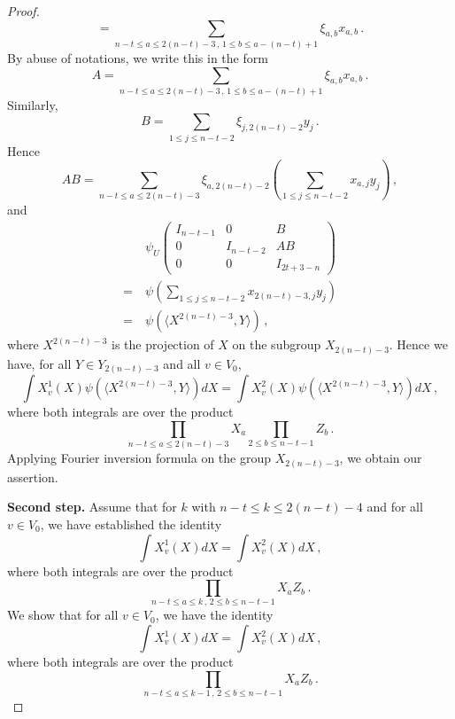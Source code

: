 \documentclass[12pt]{amsart}
\begin{document}
\begin{proof}
\[= \sum _{n-t\leq a \leq 2(n-t)-3\,,\, 1 \leq b\leq a -(n-t) +1} \xi_{a,b} x _{a,b} \,.\]
By abuse of notations, we write this in the form
\[A = \sum _{n-t\leq a \leq 2(n-t)-3\,,\, 1 \leq b\leq a -(n-t) +1} \xi_{a,b} x _{a,b} \,.\]
Similarly,  
\[ B = \sum _{1\leq j \leq n-t-2} \xi_{j, {2(n-t)-2}}y_j \,.\]
Hence
\[ AB = \sum _{n-t\leq a \leq 2(n-t)-3} \xi_{a, 2(n-t)-2} \left( \sum_{1\leq j\leq n-t-2} x_{a,j} y_j\right) \,,\]
and
\begin{align*}
& \psi_U \left(\begin{array}{ccc} I_{n-t-1} & 0 & B \\ 0 & I_{ n-t-2}& AB \\ 0 &0 &I_{ 2t + 3 -n} \end{array}\right)  \\
= \ & \psi\left(\sum_{1\leq j\leq n-t-2} x_{2(n-t)-3,j} y_j \right)\\
= \ & \psi(\langle X^{2(n-t)-3}, Y\rangle)\,, 
\end{align*}
where $ X^{2(n-t)-3}$ is the projection of $X$ on the subgroup $X_{2(n-t)-3}$. 
Hence we have, for all $Y \in Y_{2(n-t)-3}$ and all $v \in V_0$,
\[ \int X_v^1 (X)  \psi(\langle X^{2(n-t)-3}, Y\rangle) d X =\int X_v^2 (X) \psi(\langle X^{2(n-t)-3}, Y\rangle)  d X \,,\]
where both integrals are over the product
$$\prod_{n-t \leq a \leq 2(n-t)-3} X_{a} \prod_{2 \leq b \leq n-t-1} Z_b\,.$$
Applying Fourier inversion formula on the group $X_{2(n-t)-3}$, we obtain our assertion.

\textbf{Second step.}
 Assume that for $k$ with $n-t\leq k\leq 2(n-t)-4$ and for all $v \in V_0$, we have established the identity 
 \[ \int X^1_v(X) d X = \int X^2_v(X) d X\,,\]
where both integrals are over the product
\[ \prod_{n-t \leq a \leq k\,,\, 2 \leq b \leq n-t-1} X_a Z_ b\,.\]
We show that for all $v \in V_0$, we have the identity
 \[ \int X^1_v(X) d X = \int X^2_v(X) d X\,,\]
where both integrals are over the product
\[ \prod_{n-t \leq a \leq k-1\,,\, 2 \leq b \leq n-t-1} X_a Z_ b\,.\]
 

\end{proof}
\end{document}
